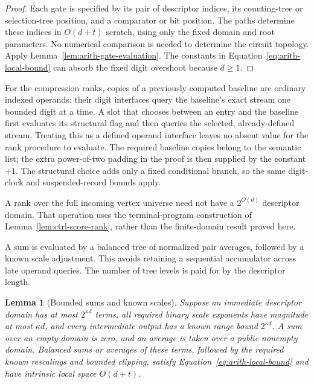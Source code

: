 \documentclass[11pt]{article}
\numberwithin{equation}{section}
\newtheorem{lemma}[theorem]{Lemma}
\theoremstyle{definition}
\theoremstyle{remark}
\begin{document}
\begin{proof}
Each gate is specified by its pair of descriptor indices, its
counting-tree or selection-tree position, and a comparator or bit
position.  The paths determine these indices in $O(d+t)$ scratch,
using only the fixed domain and root parameters.  No numerical
comparison is needed to determine the circuit topology.  Apply
Lemma~\ref{lem:arith-gate-evaluation}.  The constants in
Equation~\eqref{eq:arith-local-bound} can absorb the fixed digit
overshoot because $d\geq1$.
\end{proof}

For the compression ranks, copies of a previously computed baseline
are ordinary indexed operands: their digit interfaces query the
baseline's exact stream one bounded digit at a time.  A slot that
chooses between an entry and the baseline first evaluates its
structural flag and then queries the selected, already-defined stream.
Treating this as a defined operand interface leaves no absent value
for the rank procedure to evaluate.
The required baseline copies belong to the semantic list; the extra
power-of-two padding in the proof is then supplied by the constant
$+1$.  The structural choice adds only a fixed conditional branch,
so the same digit-clock and suspended-record bounds apply.

A rank over the full incoming vertex universe need not have a $2^{O(d)}$ descriptor domain. That operation uses the terminal-program construction of Lemma~\ref{lem:ctrl-score-rank}, rather than the finite-domain result proved here.

A sum is evaluated by a balanced tree of normalized pair averages, followed by a known scale adjustment. This avoids retaining a sequential accumulator across late operand queries. The number of tree levels is paid for by the descriptor length.

\begin{lemma}[Bounded sums and known scales]
\label{lem:arith-sums-scales}
Suppose an immediate descriptor domain has at most $2^{\kappa d}$
terms, all required binary scale exponents have magnitude at most
$\kappa d$, and every intermediate output has a known range bound
$2^{\kappa d}$.  A sum over an empty domain is zero, and an average
is taken over a public nonempty domain.  Balanced sums or averages of these terms, followed
by the required known rescalings and bounded clipping, satisfy
Equation~\eqref{eq:arith-local-bound} and have intrinsic local
space $O(d+t)$.
\end{lemma}
\end{document}
